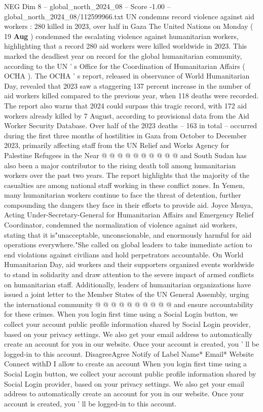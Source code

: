 \begin{textsample}{NEG Dim 8 – global\_north\_2024\_08 – Score -1.00 – global\_north\_2024\_08/112599966.txt}  \label{ex:f8_neg_125}
UN condemns record violence against aid workers : 280 killed in 2023, over half in Gaza The United Nations on Monday ( 19 \textbf{Aug} ) condemned the escalating violence against humanitarian workers, highlighting that a record 280 aid workers were killed worldwide in 2023.
This marked the deadliest year on record for the global humanitarian community, according to the UN ' s Office for the Coordination of Humanitarian Affairs ( OCHA ).
The OCHA ' s report, released in observance of World Humanitarian Day, revealed that 2023 saw a staggering 137 percent increase in the number of aid workers killed compared to the previous year, when 118 deaths were recorded.
The report also warns that 2024 could surpass this tragic record, with 172 aid workers already killed by 7 August, according to provisional data from the Aid Worker Security Database.
Over half of the 2023 deaths -- 163 in total -- occurred during the first three months of hostilities in Gaza from October to December 2023, primarily affecting staff from the UN Relief and Works Agency for Palestine Refugees in the Near @ @ @ @ @ @ @ @ @ @ and South Sudan has also been a major contributor to the rising death toll among humanitarian workers over the past two years.
The report highlights that the majority of the casualties are among national staff working in these conflict zones.
In Yemen, many humanitarian workers continue to face the threat of detention, further compounding the dangers they face in their efforts to provide aid.
Joyce Msuya, Acting Under-Secretary-General for Humanitarian Affairs and Emergency Relief Coordinator, condemned the normalization of violence against aid workers, stating that it is"unacceptable, unconscionable, and enormously harmful for aid operations everywhere."She called on global leaders to take immediate action to end violations against civilians and hold perpetrators accountable.
On World Humanitarian Day, aid workers and their supporters organized events worldwide to stand in solidarity and draw attention to the severe impact of armed conflicts on humanitarian staff.
Additionally, leaders of humanitarian organizations have issued a joint letter to the Member States of the UN General Assembly, urging the international community @ @ @ @ @ @ @ @ @ @ and ensure accountability for these crimes.
When you login first time using a Social Login button, we collect your account public profile information shared by Social Login provider, based on your privacy settings.
We also get your email address to automatically create an account for you in our website.
Once your account is created, you ' ll be logged-in to this account.
DisagreeAgree Notify of Label Name* Email* Website Connect withD I allow to create an account When you login first time using a Social Login button, we collect your account public profile information shared by Social Login provider, based on your privacy settings.
We also get your email address to automatically create an account for you in our website.
Once your account is created, you ' ll be logged-in to this account.

\end{textsample}
